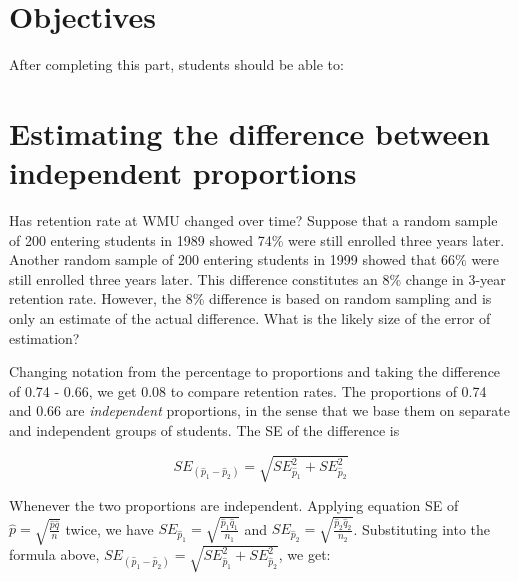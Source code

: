 \documentclass[11pt, chapterprefix=true]{scrbook}\usepackage[]{graphicx}\usepackage[]{color}
\begin{document}
\section{Objectives}

After completing this part, students should be able to:


\section{Estimating the difference between independent proportions}

Has retention rate at WMU changed over time?  Suppose that a random sample of 200 entering students in 1989 showed 74\% were still enrolled three years later.  Another random sample of 200 entering students in 1999 showed that 66\% were still enrolled three years later.  This difference constitutes an 8\% change in 3-year retention rate.  However, the 8\% difference is based on random sampling and is only an estimate of the actual difference.  What is the likely size of the error of estimation?

Changing notation from the percentage to proportions and taking the difference of
0.74 - 0.66, we get 0.08 to compare retention rates.  The proportions of 0.74 and 0.66 are \textit{independent} proportions, in the sense that we base them on separate and independent groups of students.  The SE of the difference is

\begin{equation*}
  SE_{(\hat{p}_1 - \hat{p}_2)} = \sqrt{ SE_{\hat{p}_1}^2 + SE_{\hat{p}_2}^2}
\end{equation*}

Whenever the two proportions are independent.  Applying equation SE of $\hat{p} = \sqrt{ \frac{ \hat{p} \hat{q} }{n}}$ twice, we have $SE_{\hat{p}_1} = \sqrt{ \frac{ \hat{p}_1 \hat{q}_1 }{n_1}}$ and $SE_{\hat{p}_2} = \sqrt{ \frac{ \hat{p}_2 \hat{q}_2 }{n_2}}$.  Substituting into the formula above, $SE_{(\hat{p}_1 - \hat{p}_2)} = \sqrt{ SE_{\hat{p}_1}^2 + SE_{\hat{p}_2}^2}$, we get:
\end{document}
